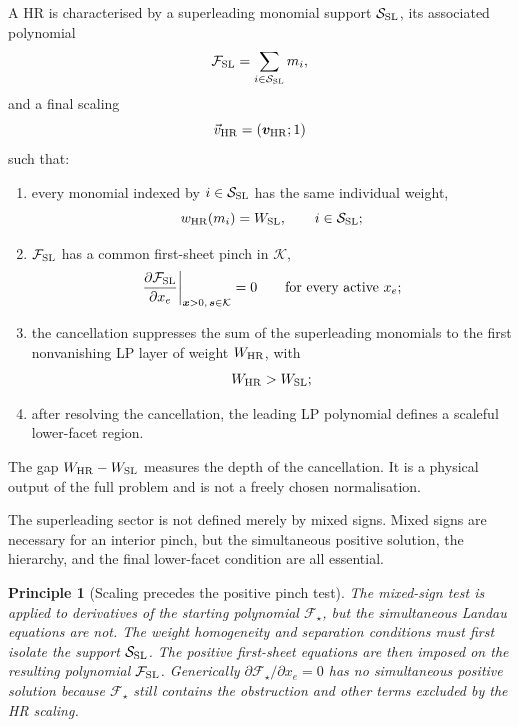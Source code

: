 \documentclass[a4paper,11pt]{article}
\newcommand{\x}{\boldsymbol{x}}
\newcommand{\s}{\boldsymbol{s}}
\newcommand{\K}{\mathcal K}
\newcommand{\HR}{\mathrm{HR}}
\newcommand{\FSL}{\mathcal F_{\rm SL}}
\newcommand{\SSL}{\mathcal S_{\rm SL}}
\newcommand{\WSL}{W_{\rm SL}}
\newcommand{\WHR}{W_{\rm HR}}
\newcommand{\vHR}{\vec v_{\rm HR}}
\newtheorem{principle}{Principle}
\begin{document}
A HR is characterised by a superleading monomial support \(\SSL\), its
associated polynomial
\begin{equation}
 \FSL=\sum_{i\in\SSL}m_i,
\label{eq:FSLsupport}
\end{equation}
and a final scaling
\begin{equation}
 \vHR=(\boldsymbol v_{\HR};1)
\end{equation}
such that:
\begin{enumerate}[label=(\alph*)]
\item every monomial indexed by \(i\in\SSL\) has the same individual weight,
      \begin{equation}
        w_{\HR}(m_i)=\WSL,
        \qquad i\in\SSL;
      \label{eq:SLhomogeneity}
      \end{equation}
\item \(\FSL\) has a common first-sheet pinch in \(\K\),
      \begin{equation}
       \left.
       \frac{\partial\FSL}{\partial x_e}
       \right|_{\x>0,\,\s\in\K}=0
       \qquad\text{for every active }x_e;
      \label{eq:SLpinch}
      \end{equation}
\item the cancellation suppresses the sum of the superleading monomials to
      the first nonvanishing LP layer of weight \(\WHR\), with
      \begin{equation}
        \WHR>\WSL;
      \label{eq:gap}
      \end{equation}
\item after resolving the cancellation, the leading LP polynomial defines a
      scaleful lower-facet region.
\end{enumerate}
The gap \(\WHR-\WSL\) measures the depth of the cancellation.  It is a
physical output of the full problem and is not a freely chosen normalisation.

The superleading sector is not defined merely by mixed signs.  Mixed signs
are necessary for an interior pinch, but the simultaneous positive solution,
the hierarchy, and the final lower-facet condition are all essential.

\begin{principle}[Scaling precedes the positive pinch test]
The mixed-sign test is applied to derivatives of the starting polynomial
\(\mathcal F_\star\), but the simultaneous Landau equations are not.  The
weight homogeneity and separation conditions must first isolate the support
\(\SSL\).  The positive first-sheet equations are then imposed on the
resulting polynomial \(\FSL\).  Generically
\(\partial\mathcal F_\star/\partial x_e=0\) has no simultaneous positive
solution because \(\mathcal F_\star\) still contains the obstruction and
other terms excluded by the HR scaling.
\label{pr:scaling-before-pinch}
\end{principle}
\end{document}
